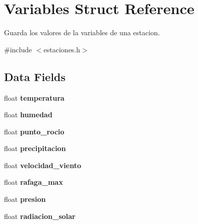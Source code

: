 \hypertarget{struct_variables}{}\section{Variables Struct Reference}
\label{struct_variables}


Guarda los valores de la variables de una estacion.  




{\ttfamily \#include $<$estaciones.\+h$>$}

\subsection*{Data Fields}
\begin{DoxyCompactItemize}
\item 
float {\bfseries temperatura}\hypertarget{struct_variables_a8347aeb522c9e13e9f376640fad780e7}{}\label{struct_variables_a8347aeb522c9e13e9f376640fad780e7}

\item 
float {\bfseries humedad}\hypertarget{struct_variables_a34280c09711b9f4f72211e5c467b57bf}{}\label{struct_variables_a34280c09711b9f4f72211e5c467b57bf}

\item 
float {\bfseries punto\+\_\+rocio}\hypertarget{struct_variables_ab67358f4698862a2d475ac18e89dd00b}{}\label{struct_variables_ab67358f4698862a2d475ac18e89dd00b}

\item 
float {\bfseries precipitacion}\hypertarget{struct_variables_abc60df6e6dbfecbc25cfdffef13a4265}{}\label{struct_variables_abc60df6e6dbfecbc25cfdffef13a4265}

\item 
float {\bfseries velocidad\+\_\+viento}\hypertarget{struct_variables_a007ce1e7390c98b60077ab2c30201313}{}\label{struct_variables_a007ce1e7390c98b60077ab2c30201313}

\item 
float {\bfseries rafaga\+\_\+max}\hypertarget{struct_variables_a07f2e700caeeb1afaad058ff59c90215}{}\label{struct_variables_a07f2e700caeeb1afaad058ff59c90215}

\item 
float {\bfseries presion}\hypertarget{struct_variables_a954f16304cc74c7f802fd4c7ae0ab6e4}{}\label{struct_variables_a954f16304cc74c7f802fd4c7ae0ab6e4}

\item 
float {\bfseries radiacion\+\_\+solar}\hypertarget{struct_variables_a0bb5b179275442bd885712fd4f50f764}{}\label{struct_variables_a0bb5b179275442bd885712fd4f50f764}


\end{DoxyCompactItemize}
